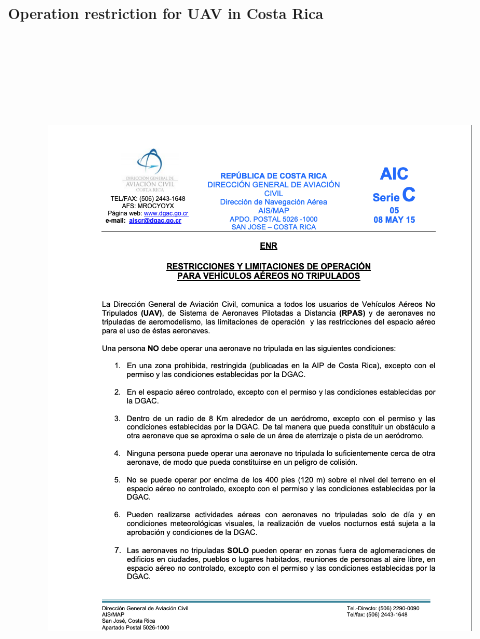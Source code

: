 \appendix
\section{}
\section{}
\textbf{Operation restriction for UAV in Costa Rica}
\begin{figure}[H]
\centering
\includegraphics[width=18cm,height=18cm,keepaspectratio]{imagenes/DGAC.png}
\label{fig:Rolling}
\end{figure}

